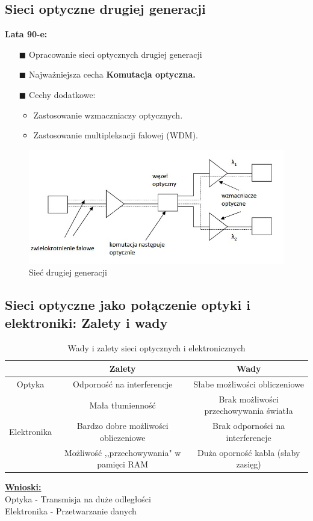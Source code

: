 \documentclass{article}
\begin{document}
\subsection{Sieci optyczne drugiej generacji}
\textbf{Lata 90-e:}
\begin{enumerate}
    \item[$\blacksquare$] Opracowanie sieci optycznych drugiej generacji
    \item[$\blacksquare$] Najważniejsza cecha \textbf{Komutacja optyczna.}
    \item[$\blacksquare$] Cechy dodatkowe:
        \begin{itemize}
            \item Zastosowanie wzmaczniaczy optycznych.
            \item Zastosowanie multipleksacji falowej (WDM).
        \end{itemize}
\end{enumerate}
\begin{figure}[H]
    \centering
    \includegraphics[width=0.7\linewidth]{w02z03.jpg}
    \caption{Sieć drugiej generacji}
\end{figure}

\newpage
\subsection{Sieci optyczne jako połączenie optyki i elektroniki: Zalety i wady} 
\begin{table}[H]
    \caption{Wady i zalety sieci optycznych i elektronicznych}
    \centering
    \begin{tabular}{ccc}
    \hline
         & Zalety & Wady \\
         \hline
        Optyka  & Odporność na interferencje & Słabe możliwości obliczeniowe\\
                & Mała tłumienność &  Brak możliwości przechowywania światła \\
        \hline
        Elektronika & Bardzo dobre możliwości obliczeniowe & Brak odporności na interferencje\\
                    & Możliwość ,,przechowywania" w pamięci RAM & Duża oporność kabla (słaby zasięg)\\
    \end{tabular}    
    \label{tab:my_label}
\end{table}
\underline{\textbf{Wnioski:}} \\
Optyka - Transmisja na duże odległości\\
Elektronika - Przetwarzanie danych
\end{document}
